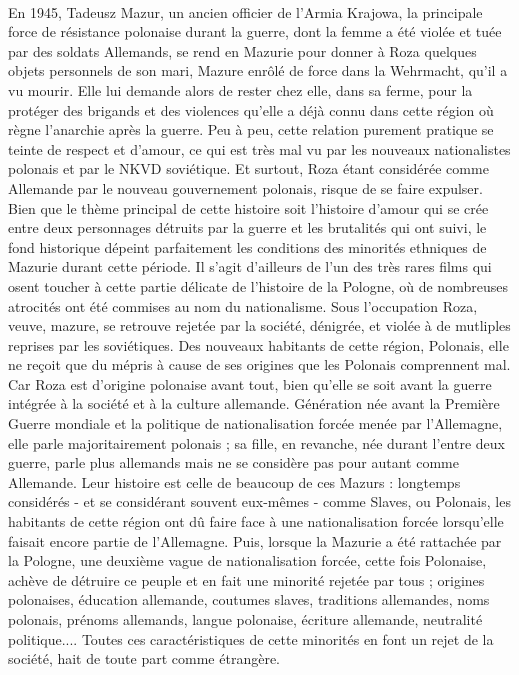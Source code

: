 \documentclass[12pt]{amsart}
\begin{document}
\paragraph{}
En 1945, Tadeusz Mazur, un ancien officier de l'Armia Krajowa, la principale force de résistance polonaise durant la guerre, dont la femme a été violée et tuée par des soldats Allemands, se rend en Mazurie pour donner à Roza quelques objets personnels de son mari, Mazure enrôlé de force dans la Wehrmacht, qu'il a vu mourir. Elle lui demande alors de rester chez elle, dans sa ferme, pour la protéger des brigands et des violences qu'elle a déjà connu dans cette région où règne l'anarchie après la guerre. Peu à peu, cette relation purement pratique se teinte de respect et d'amour, ce qui est très mal vu par les nouveaux nationalistes polonais et par le NKVD soviétique. Et surtout, Roza étant considérée comme Allemande par le nouveau gouvernement polonais, risque de se faire expulser. \\
Bien que le thème principal de cette histoire soit l'histoire d'amour qui se crée entre deux personnages détruits par la guerre et les brutalités qui ont suivi, le fond historique dépeint parfaitement les conditions des minorités ethniques de Mazurie durant cette période. Il s'agit d'ailleurs de l'un des très rares films qui osent toucher à cette partie délicate de l'histoire de la Pologne, où de nombreuses atrocités ont été commises au nom du nationalisme. Sous l'occupation Roza, veuve, mazure, se retrouve rejetée par la société, dénigrée, et violée à de mutliples reprises par les soviétiques. Des nouveaux habitants de cette région, Polonais, elle ne reçoit que du mépris à cause de ses origines que les Polonais comprennent mal. Car Roza est d'origine polonaise avant tout, bien qu'elle se soit avant la guerre intégrée à la société et à la culture allemande. Génération née avant la Première Guerre mondiale et la politique de nationalisation forcée menée par l'Allemagne, elle parle majoritairement polonais ; sa fille, en revanche, née durant l'entre deux guerre, parle plus allemands mais ne se considère pas pour autant comme Allemande. Leur histoire est celle de beaucoup de ces Mazurs : longtemps considérés - et se considérant souvent eux-mêmes - comme Slaves, ou Polonais, les habitants de cette région ont dû faire face à une nationalisation forcée lorsqu'elle faisait encore partie de l'Allemagne. Puis, lorsque la Mazurie a été rattachée par la Pologne, une deuxième vague de nationalisation forcée, cette fois Polonaise, achève de détruire ce peuple et en fait une minorité rejetée par tous ; origines polonaises, éducation allemande, coutumes slaves, traditions allemandes, noms polonais, prénoms allemands, langue polonaise, écriture allemande, neutralité politique.... Toutes ces caractéristiques de cette minorités en font un rejet de la société, hait de toute part comme étrangère. 
\clearpage
\end{document}
